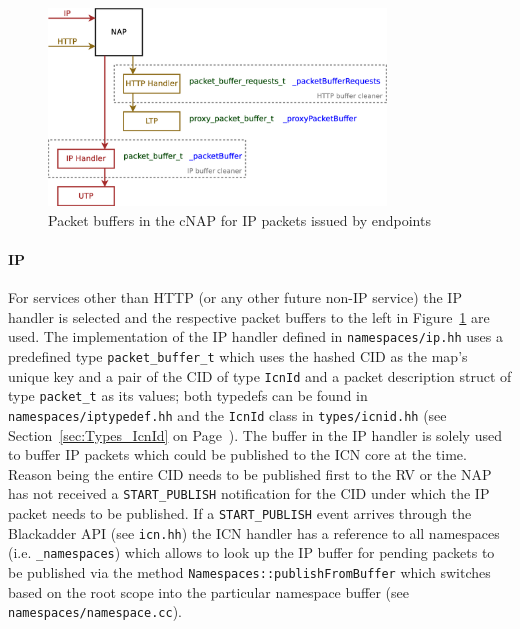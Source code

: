 \documentclass[a4paper,11pt,titlepage]{report}
\begin{document}
\begin{figure}
	\begin{center}
		\includegraphics[width=0.8\textwidth]{eps/packetBuffersInTheNap-incomingIpPackets-cNap.eps}
		\caption{Packet buffers in the \acl{cNAP} for IP packets issued by endpoints}
		\label{fig:packetBuffers-incomingIpPackets-cNap}
	\end{center}
\end{figure}

\paragraph{IP}
For services other than HTTP (or any other future non-IP service) the IP handler is selected and the respective packet buffers to the left in Figure~\ref{fig:packetBuffers-incomingIpPackets-cNap} are used. The implementation of the IP handler defined in \texttt{namespaces/ip.hh} uses a predefined type \texttt{packet\_buffer\_t} which uses the hashed \ac{CID} as the map's unique key and a pair of the \ac{CID} of type \texttt{IcnId} and a packet description struct of type \texttt{packet\_t} as its values; both typedefs can be found in \texttt{namespaces/iptypedef.hh} and the \texttt{IcnId} class in \texttt{types/icnid.hh} (see Section~\ref{sec:Types_IcnId} on Page~\pageref{sec:Types_IcnId}). The buffer in the IP handler is solely used to buffer IP packets which could be published to the \ac{ICN} core at the time. Reason being the entire \ac{CID} needs to be published first to the \ac{RV} or the \ac{NAP} has not received a \texttt{START\_PUBLISH} notification for the \ac{CID} under which the IP packet needs to be published. If a \texttt{START\_PUBLISH} event arrives through the Blackadder API (see \texttt{icn.hh}) the \ac{ICN} handler has a reference to all namespaces (i.e. \texttt{\_namespaces}) which allows to look up the IP buffer for pending packets to be published via the method \texttt{Namespaces::publishFromBuffer} which switches based on the root scope into the particular namespace buffer (see \texttt{namespaces/namespace.cc}).
\end{document}
